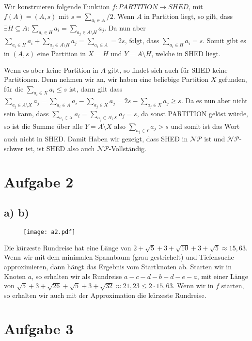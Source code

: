 \documentclass[a4paper,11pt]{article}
\begin{document}
Wir konstruieren folgende Funktion $f: PARTITION \to SHED$, mit $f(A) = (A,s)$ mit $s=\sum_{a_i\in A}/2$. Wenn $A$ in Partition liegt, so gilt, dass $\exists H\subseteq A: \sum_{a_i\in H}a_i = \sum_{a_j\in A\setminus H}a_j$. Da nun aber $\sum_{a_i\in H}a_i+\sum_{a_j\in A\setminus H}a_j = \sum_{a_i\in A} = 2s$, folgt, dass $\sum_{a_i\in H}a_i= s$. Somit gibt es in $(A,s)$ eine Partition in $X=H$ und $Y=A\setminus H$, welche in SHED liegt. 

Wenn es aber keine Partition in $A$ gibt, so findet sich auch für SHED keine Partitionen. Denn nehmen wir an, wir haben eine beliebige Partition $X$ gefunden, für die $\sum_{a_i\in X}a_i\leq s$ ist, dann gilt dass $\sum_{a_j\in A\setminus X}a_j = \sum_{a_i\in A}a_i - \sum_{a_j\in X}a_j = 2s - \sum_{a_j\in X}a_j \geq s$. Da es nun aber nicht sein kann, dass $\sum_{a_i\in X}a_i = \sum_{a_j\in A\setminus X}a_j = s$, da sonst PARTITION gelöst würde, so ist die Summe über alle $Y=A\setminus X$ also $\sum_{a_j\in Y}a_j > s$ und somit ist das Wort auch nicht in SHED. Damit Haben wir gezeigt, dass SHED in $\mathcal{NP}$ ist und $\mathcal{NP}$-schwer ist, ist SHED also auch $\mathcal{NP}$-Vollständig. \\


\section*{Aufgabe 2}

\subsection*{a) \hspace{4.5cm} b) \vspace{-0.4cm}}
\begin{figure}[h]
\texttt{[image: a2.pdf]}
\end{figure}

Die kürzeste Rundreise hat eine Länge von $2+\sqrt 5+3+\sqrt{10}+3+\sqrt 5 \approx 15,63$. Wenn wir mit dem minimalen Spannbaum (grau gestrichelt) und Tiefensuche approximieren, dann hängt das Ergebnis vom Startknoten ab. Starten wir in Knoten $a$, so erhalten wir als Rundreise $a-c-d-b-d-e-a$, mit einer Länge von $\sqrt 5+3+\sqrt{26}+\sqrt 5+3+\sqrt{32}\approx 21,23\leq 2\cdot 15,63$. Wenn wir in $f$ starten, so erhalten wir auch mit der Approximation die kürzeste Rundreise. \\


\section*{Aufgabe 3}
\end{document}
